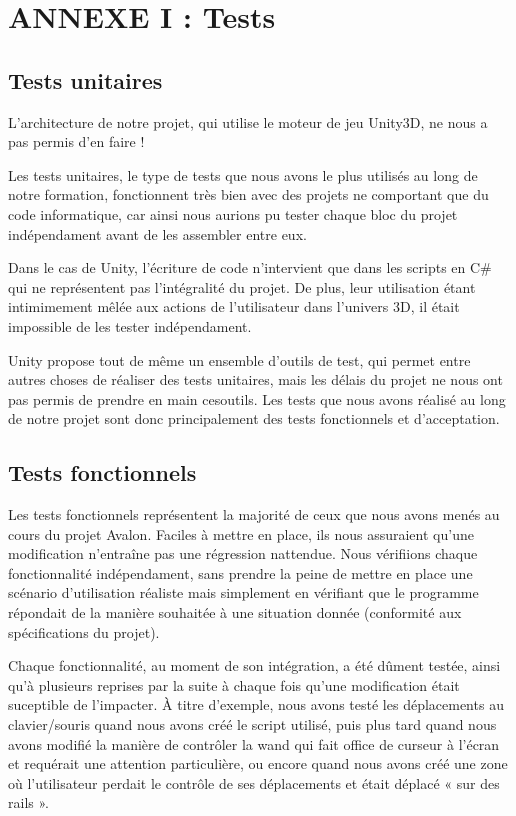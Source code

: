 \section{ANNEXE I : Tests}

\subsection{Tests unitaires}
L'architecture de notre projet, qui utilise le moteur de jeu Unity3D, ne nous a pas permis d'en faire ! \newline

Les tests unitaires, le type de tests que nous avons le plus utilisés au long de notre formation, fonctionnent très bien avec des projets ne comportant que du code informatique, car ainsi nous aurions pu tester chaque bloc du projet indépendament avant de les assembler entre eux. \newline

Dans le cas de Unity, l'écriture de code n'intervient que dans les scripts en C\# qui ne représentent pas l'intégralité du projet. De plus, leur utilisation étant intimimement mêlée aux actions de l'utilisateur dans l'univers 3D, il était impossible de les tester indépendament. \newline

Unity propose tout de même un ensemble d'outils de test, qui permet entre autres choses de réaliser des tests unitaires, mais les délais du projet ne nous ont pas permis de prendre en main cesoutils. Les tests que nous avons réalisé au long de notre projet sont donc principalement des tests fonctionnels et d'acceptation. 

\subsection{Tests fonctionnels}

Les tests fonctionnels représentent la majorité de ceux que nous avons menés au cours du projet Avalon. Faciles à mettre en place, ils nous assuraient qu'une modification n'entraîne pas une régression nattendue. Nous vérifiions chaque fonctionnalité indépendament, sans prendre la peine de mettre en place une scénario d'utilisation réaliste mais simplement en vérifiant que le programme répondait de la manière souhaitée à une situation donnée (conformité aux spécifications du projet).\newline

Chaque fonctionnalité, au moment de son intégration, a été dûment testée, ainsi qu'à plusieurs reprises par la suite à chaque fois qu'une modification était suceptible de l'impacter. À titre d'exemple, nous avons testé les déplacements au clavier/souris quand nous avons créé le script utilisé, puis plus tard quand nous avons modifié la manière de contrôler la wand qui fait office de curseur à l'écran et requérait une attention particulière, ou encore quand nous avons créé une zone où l'utilisateur perdait le contrôle de ses déplacements et était déplacé « sur des rails ».\newline

